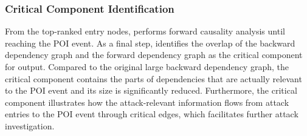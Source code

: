 \subsubsection{Critical Component Identification}
\label{subsubsec:forward-causality}
From the top-ranked entry nodes, \tool performs forward causality analysis until reaching the POI event. 
%
As a final step, \tool identifies the overlap of the backward dependency graph and the forward dependency graph as the critical component for output.
%
Compared to the original large backward dependency graph, the critical component contains the parts of dependencies that are actually relevant to the POI event and its size is significantly reduced.
%
Furthermore, the critical component illustrates how the attack-relevant information flows from attack entries to the POI event through critical edges, which facilitates further attack investigation.